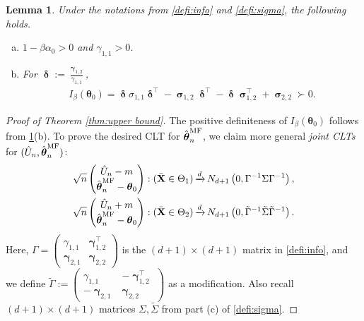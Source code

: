 \documentclass[preprint,reqno]{imsart}
\newtheorem{lemma}[thm]{Lemma}
\newcommand{\ttheta}{\boldsymbol{\theta}}
\DeclareMathOperator{\xd}{\xrightarrow{\mathnormal d}}
\DeclareMathOperator{\ggamma}{\boldsymbol{\gamma}}
\DeclareMathOperator{\ssigma}{\boldsymbol{\sigma}}
\DeclareMathOperator{\ddelta}{\boldsymbol{\delta}}
\newcommand{\X}{\mathbf{X}}
\newcommand{\thetamf}{\hat{\boldsymbol \theta}^{\text{MF}}_{\mathnormal n}}
\begin{document}
\begin{appendix}
\begin{lemma}\label{lem:variance simplification}
    Under the notations from \cref{defi:info} and \cref{defi:sigma}, the following holds.
    \begin{enumerate}[(a)]
        \item $1 - \beta \alpha_0 > 0$ and $\gamma_{1,1} > 0$.
        \item For $\ddelta := \frac{\ggamma_{1,2}}{\gamma_{1,1}}$,
        \begin{align}\label{eq:variance information eq}
        I_\beta(\ttheta_0) = \ddelta \sigma_{1,1} \ddelta^{\top} - \ssigma_{1,2} \ddelta^{\top} - \ddelta \ssigma_{1,2}^{\top} + \ssigma_{2,2} \succ 0.
\end{align}
\end{enumerate}
\end{lemma}

\begin{proof}[Proof of Theorem \ref{thm:upper bound}]
    The positive definiteness of $I_\beta(\ttheta_0)$ follows from \cref{lem:variance simplification}(b). To prove the desired CLT for $\thetamf$, we claim more general \textit{joint CLTs} for $(\hat{U}_n, \thetamf)$:
    \begin{align}
        \sqrt{n} \begin{pmatrix} \hat{U}_n - m \\ \thetamf - \ttheta_0 \end{pmatrix} : (\bar{\X} \in \Theta_1) \xd N_{d+1} \left(0, \Gamma^{-1} \Sigma \Gamma^{-1} \right), \label{eq:CLT_upper bound}\\
        \sqrt{n} \begin{pmatrix} \hat{U}_n + m \\ \thetamf - \ttheta_0 \end{pmatrix} : (\bar{\X} \in \Theta_2) \xd N_{d+1} \left(0, \tilde{\Gamma}^{-1} \tilde{\Sigma} \tilde{\Gamma}^{-1} \right). \label{eq:CLT_upper bound 2}
    \end{align}
    Here, $\Gamma = \begin{pmatrix}
        \gamma_{1,1} & \ggamma_{1,2}^\top \\
        \ggamma_{2,1} & \ggamma_{2,2}
    \end{pmatrix}$ is the $(d+1)\times (d+1)$ matrix in \cref{defi:info}, and we define $\tilde{\Gamma} := \begin{pmatrix}
        \gamma_{1,1} & -\ggamma_{1,2}^\top \\
        - \ggamma_{2,1} & \ggamma_{2,2}
    \end{pmatrix}$ as a modification. Also recall $(d+1)\times (d+1)$ matrices $\Sigma, \tilde{\Sigma}$ from part (c) of \cref{defi:sigma}.


\end{proof}
\end{appendix}
\end{document}
